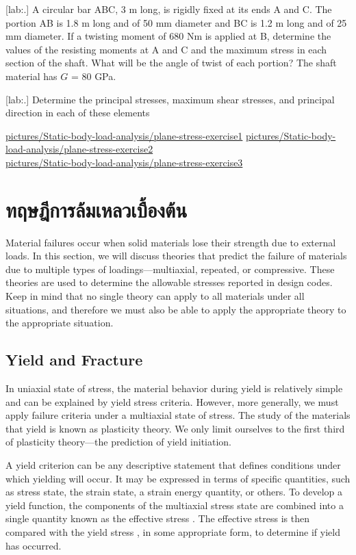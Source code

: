 \documentclass[a4paper,openany,12pt]{book}
\begin{document}
[lab:.] A circular bar ABC, 3 m long,
is rigidly fixed at its ends A and C. The portion AB is 1.8 m long and
of 50 mm diameter and BC is 1.2 m long and of 25 mm diameter. If a
twisting moment of 680 Nm is applied at B, determine the values of the
resisting moments at A and C and the maximum stress in each section of
the shaft. What will be the angle of twist of each portion? The shaft
material has \(G\) = 80 GPa.

[lab:.] Determine the principal
stresses, maximum shear stresses, and principal direction in each of
these elements

\url{pictures/Static-body-load-analysis/plane-stress-exercise1}
\url{pictures/Static-body-load-analysis/plane-stress-exercise2}\\
\url{pictures/Static-body-load-analysis/plane-stress-exercise3}

\chapter{ทฤษฎีการล้มเหลวเบื้องต้น}
\label{sec:org3c4135e}
Material failures occur when solid materials lose their strength due to
external loads. In this section, we will discuss theories that predict
the failure of materials due to multiple types of loadings---multiaxial,
repeated, or compressive. These theories are used to determine the
allowable stresses reported in design codes. Keep in mind that no single
theory can apply to all materials under all situations, and therefore we
must also be able to apply the appropriate theory to the appropriate
situation.

\section{Yield and Fracture}
\label{sec:orgb7852ce}
In uniaxial state of stress, the material behavior during yield is
relatively simple and can be explained by yield stress criteria.
However, more generally, we must apply failure criteria under a
multiaxial state of stress. The study of the materials that yield is
known as plasticity theory. We only limit ourselves to the first third
of plasticity theory---the prediction of yield initiation.

A yield criterion can be any descriptive statement that defines
conditions under which yielding will occur. It may be expressed in terms
of specific quantities, such as stress state, the strain state, a strain
energy quantity, or others. To develop a yield function, the components
of the multiaxial stress state are combined into a single quantity known
as the effective stress . The effective stress is then compared with the
yield stress , in some appropriate form, to determine if yield has
occurred.
\end{document}
